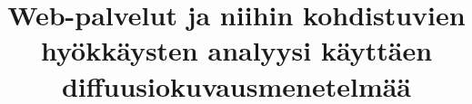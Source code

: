 \documentclass[finnish,logo,nonumbib,creativecommons,nocopyright,lof,pdftex,palatino,utf8]{gradu2}
\title{Web-palvelut ja niihin kohdistuvien hyökkäysten analyysi
  käyttäen diffuusiokuvausmenetelmää}
\begin{document}



\mainmatter












{}
%


\appendix

%
%
\end{document}

